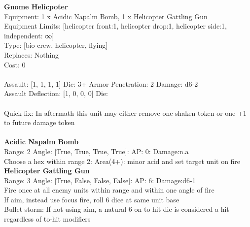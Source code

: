 {\bf Gnome Helicpoter } \\
Equipment: 1 x Acidic Napalm Bomb, 1 x Helicopter Gattling Gun \\
Equipment Limits: [helicopter front:1, helicopter drop:1, helicopter side:1, independent: ∞] \\
Type: [bio crew, helicopter, flying] \\
Replaces: Nothing \\
Cost: 0\\
\ \\
Assault: [1, 1, 1, 1] Die: 3+ Armor Penetration: 2 Damage: d6-2 \\
Assault Deflection: [1, 0, 0, 0] Die: \\
\indent  
\ \\
Quick fix: In aftermath this unit may either remove one shaken token or one +1 to future damage token\\ 

\ \\
{\bf Acidic Napalm Bomb } \\



Range: 2  Angle: [True, True, True, True]: AP: 0: Damage:n.a \\
Choose a hex within range 2: Area(4+): minor acid and set target unit on fire\\ 




{\bf Helicopter Gattling Gun } \\



Range: 3  Angle: [True, False, False, False]: AP: 6: Damage:d6-1 \\
Fire once at all enemy units within range and within one angle of fire\\ 
If aim, instead use focus fire, roll 6 dice at same unit base\\ 
Bullet storm: If not using aim, a natural 6 on to-hit die is considered a hit regardless of to-hit modifiers\\ 




 
\ \\



